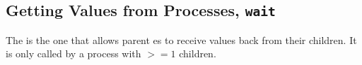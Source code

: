 \subsection{Getting Values from Processes, \texttt{wait}}\label{subsec:Values_from_Processes-wait}
The   is the one that allows parent es to receive values back from their children.
It is only called by a process with $>= 1$ children.


